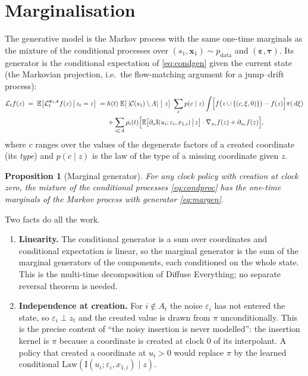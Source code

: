\documentclass[11pt]{article}
\newtheorem{proposition}{Proposition}
\newcommand{\C}{\mathcal{C}}
\newcommand{\A}{A}
\newcommand{\gen}{\mathcal{L}}
\newcommand{\E}{\mathbb{E}}
\newcommand{\dd}{\,\mathrm{d}}
\newcommand{\bx}{\bm{x}}
\newcommand{\beps}{\bm{\varepsilon}}
\newcommand{\btau}{\bm{\tau}}
\newcommand{\Iu}{\mathrm{I}}
\begin{document}
\section{Marginalisation}

The generative model is the Markov process with the same one-time marginals as the mixture of the conditional processes over $(s_1,\bx_1)\sim p_{\mathrm{data}}$ and $(\beps,\btau)$. Its generator is the conditional expectation of \eqref{eq:condgen} given the current state (the Markovian projection, i.e.\ the flow-matching argument for a jump--drift process):
\begin{equation}
\label{eq:margen}
\begin{aligned}
\gen_t f(z)\;=\;\E\bigl[\gen^{\bx_1,\beps}_t f(z)\,\big|\,z_t=z\bigr]
\;=\;&h(t)\;\E\bigl[\,|\C(s_1)\setminus\A|\ \big|\ z\bigr]\;\sum_{c}p(c\mid z)\int\Bigl[f\bigl(z\cup\{(c,\xi,0)\}\bigr)-f(z)\Bigr]\pi(\dd\xi)\\
&+\sum_{i\in\A}\rho_i(t)\Bigl[\E\bigl[\partial_u\Iu(u_i;\varepsilon_i,x_{1,i})\,\big|\,z\bigr]\cdot\nabla_{x_i}f(z)+\partial_{u_i}f(z)\Bigr],
\end{aligned}
\end{equation}
where $c$ ranges over the values of the degenerate factors of a created coordinate (its \emph{type}) and $p(c\mid z)$ is the law of the type of a missing coordinate given $z$.

\begin{proposition}[Marginal generator]
\label{prop:marginal}
For any clock policy with creation at clock zero, the mixture of the conditional processes \eqref{eq:condproc} has the one-time marginals of the Markov process with generator \eqref{eq:margen}.
\end{proposition}

Two facts do all the work.
\begin{enumerate}
\item \textbf{Linearity.} The conditional generator is a sum over coordinates and conditional expectation is linear, so the marginal generator is the sum of the marginal generators of the components, each conditioned on the whole state. This is the multi-time decomposition of Diffuse Everything; no separate reversal theorem is needed.
\item \textbf{Independence at creation.} For $i\notin\A_t$ the noise $\varepsilon_i$ has not entered the state, so $\varepsilon_i\perp z_t$ and the created value is drawn from $\pi$ unconditionally. This is the precise content of ``the noisy insertion is never modelled'': the insertion kernel is $\pi$ because a coordinate is created at clock $0$ of its interpolant. A policy that created a coordinate at $u_i>0$ would replace $\pi$ by the learned conditional $\mathrm{Law}(\Iu(u_i;\varepsilon_i,x_{1,i})\mid z)$.
\end{enumerate}
\end{document}
